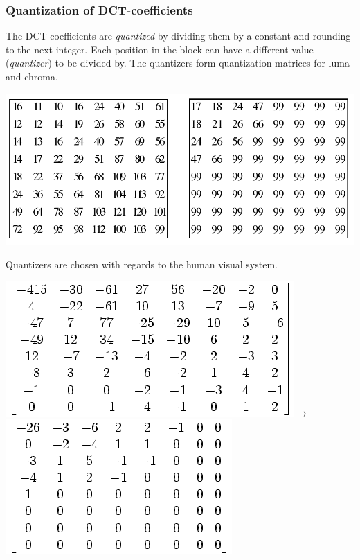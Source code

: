 \documentclass{beamer}
\begin{document}
\begin{frame}
\frametitle{Quantization of DCT-coefficients}
The DCT coefficients are \textit{quantized} by dividing them 
by a constant and rounding to the next integer. 
Each position in the block can have a different value (\textit{quantizer}) 
to be divided by. The quantizers form quantization 
matrices for luma and chroma.
\begin{center}
\includegraphics[height=0.26\textwidth]{quantization-matrix}
\end{center}

Quantizers are chosen with regards to the human visual system.

\begin{center}
\includegraphics[height=0.2\textwidth]{DCT-matrix}\quad$\rightarrow$\quad
\includegraphics[height=0.2\textwidth]{quantized-matrix}
\end{center}

\end{frame}
\end{document}

